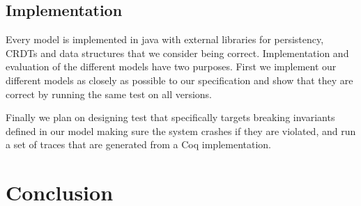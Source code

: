 \documentclass[systeme]{compas2022}
\begin{document}
\subsection{Implementation}

Every model is implemented in java with external libraries for persistency, CRDTs and data structures that we consider being correct.
Implementation and evaluation of the different models have two purposes.
First we implement our different models as closely as possible to our specification and show that they are correct by running the same test on all versions.

Finally we plan on designing test that specifically targets breaking invariants defined in our model making sure the system crashes if they are violated, and run a set of traces that are generated from a Coq implementation.



\section{Conclusion}



\end{document}
